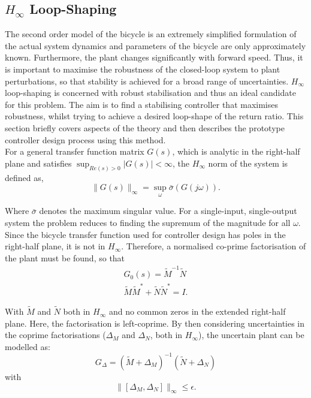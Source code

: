 \subsection{$H_{\infty}$ Loop-Shaping}
The second order model of the bicycle is an extremely simplified formulation of the actual system dynamics and parameters of the bicycle are only approximately known. Furthermore, the plant changes significantly with forward speed. Thus, it is important to maximise the robustness of the closed-loop system to plant perturbations, so that stability is achieved for a broad range of uncertainties. $H_{\infty}$ loop-shaping is concerned with robust stabilisation and thus an ideal candidate for this problem. The aim is to find a stabilising controller that maximises robustness, whilst trying to achieve a desired loop-shape of the return ratio. This section briefly covers aspects of the theory and then describes the prototype controller design process using this method. \\

For a general transfer function matrix $G(s)$, which is analytic in the right-half plane and satisfies $\sup_{Re(s) > 0}{|G(s)|}<\infty$, the $H_{\infty}$ norm of the system is defined as,
\begin{equation*}
\lVert G(s) \rVert_{\infty} = \sup_{\omega}{\bar{\sigma}(G(j\omega))}.
\end{equation*}

Where $\bar{\sigma}$ denotes the maximum singular value. For a single-input, single-output system the problem reduces to finding the supremum of the magnitude for all $\omega$. \\
Since the bicycle transfer function used for controller design has poles in the right-half plane, it is not in $H_{\infty}$. Therefore, a normalised co-prime factorisation of the plant must be found, so that
\begin{align*}
G_0(s) = \tilde{M}^{-1} \tilde{N} \\
\tilde{M} \tilde{M}^* + \tilde{N} \tilde{N}^* = I.
\end{align*}

With $\tilde{M}$ and $\tilde{N}$ both in $H_{\infty}$ and no common zeros in the extended right-half plane. Here, the factorisation is left-coprime. By then considering uncertainties in the coprime factorisations ($\Delta_M$ and $\Delta_N$, both in $H_{\infty}$), the uncertain plant can be modelled as:
\begin{equation*}
G_{\Delta} = (\tilde{M} + \Delta_M)^{-1} (\tilde{N} + \Delta_N)
\end{equation*}
with
\begin{equation*}
\lVert [\Delta_M, \Delta_N] \rVert_{\infty} \leq \epsilon.
\end{equation*}

